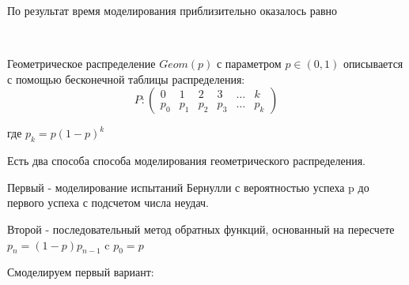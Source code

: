 \documentclass[a4paper,12pt, oneside]{book}
\begin{document}
{{По результат время моделирования приблизительно оказалось равно

\vspace{5mm}
\\
\vspace{5mm}


Геометрическое распределение $Geom(p)$  с параметром $p \in (0,1)$ описывается с помощью бесконечной таблицы распределения:
$$
P: \left(
\begin{array}{cccccc}
0 & 1 & 2& 3 &\ldots & k\\
p_0 & p_1 & p_2 & p_3 & \ldots &  p_k
\end{array}
\right)
$$

где $p_k = p(1 - p)^k$

Есть два способа способа моделирования геометрического распределения.

Первый - моделирование испытаний Бернулли с вероятностью успеха  p до первого успеха с подсчетом числа неудач.

Второй - последовательный метод обратных функций, основанный на пересчете $p_n = (1 - p)p_{n-1}$ c $p_0 = p$

Смоделируем первый вариант:

}}
\end{document}
